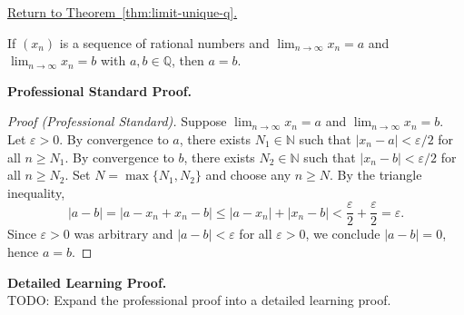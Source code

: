 
\newpage
{}
\label{prf:limit-unique-q}

\begin{remark*}[Return]
\hyperref[thm:limit-unique-q]{Return to Theorem~\ref*{thm:limit-unique-q}.}
\end{remark*}

\begin{theorem*}
If $(x_n)$ is a sequence of rational numbers and
$\lim_{n\to\infty} x_n = a$ and $\lim_{n\to\infty} x_n = b$
with $a,b \in \mathbb{Q}$, then $a = b$.
\end{theorem*}

\textbf{Professional Standard Proof.}~\\
\begin{proof}
[Proof (Professional Standard)]
Suppose $\lim_{n\to\infty} x_n = a$ and $\lim_{n\to\infty} x_n = b$.
Let $\varepsilon > 0$.
By convergence to $a$, there exists $N_1 \in \mathbb{N}$ such that
$|x_n - a| < \varepsilon/2$ for all $n \geq N_1$.
By convergence to $b$, there exists $N_2 \in \mathbb{N}$ such that
$|x_n - b| < \varepsilon/2$ for all $n \geq N_2$.
Set $N = \max\{N_1, N_2\}$ and choose any $n \geq N$.  By the triangle inequality,
\[
|a - b|
= |a - x_n + x_n - b|
\leq |a - x_n| + |x_n - b|
< \frac{\varepsilon}{2} + \frac{\varepsilon}{2}
= \varepsilon.
\]
Since $\varepsilon > 0$ was arbitrary and $|a - b| < \varepsilon$ for all
$\varepsilon > 0$, we conclude $|a - b| = 0$, hence $a = b$.
\end{proof}

\textbf{Detailed Learning Proof.}~\\
TODO: Expand the professional proof into a detailed learning proof.


